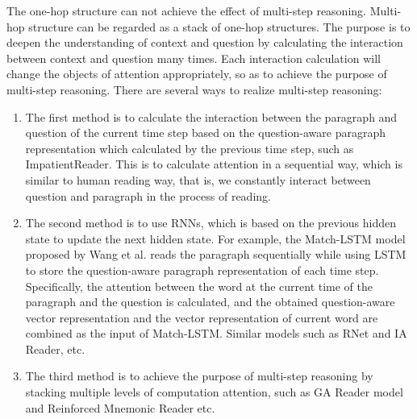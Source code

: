 The one-hop structure can not achieve the effect of multi-step reasoning. Multi-hop structure can be regarded as a stack of one-hop structures. 
The purpose is to deepen the understanding of context and question by calculating the interaction between context and question many times. Each interaction calculation will change the objects of attention appropriately, 
so as to achieve the purpose of multi-step reasoning. There are several ways to realize multi-step reasoning: 
\begin{enumerate}
	\item The first method is to calculate the interaction between the paragraph and question of the current time step based on the question-aware paragraph representation which calculated by the previous time step, such as ImpatientReader. This is to calculate attention in a sequential way, which is similar to human reading way, that is, we constantly interact between question and paragraph in the process of reading.
	\item The second method is to use RNNs, which is based on the previous hidden state to update the next hidden state. For example, the Match-LSTM model proposed by Wang et al. reads the paragraph sequentially while using LSTM to store the question-aware paragraph representation of each time step. Specifically, the attention between the word at the current time of the paragraph and the question is calculated, 
	and the obtained question-aware vector representation and the vector representation of current word are combined as the input of Match-LSTM. Similar models such as RNet and IA Reader, etc.
	\item The third method is to achieve the purpose of multi-step reasoning by stacking multiple levels of computation attention, such as GA Reader model and Reinforced Mnemonic Reader etc.
\end{enumerate}